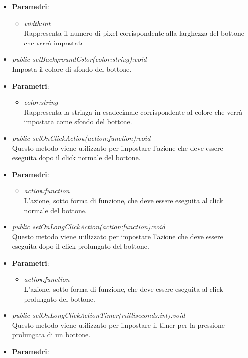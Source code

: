 \begin{itemize}
\begin{itemize}
		\item{\textbf{Parametri}: \begin{itemize}
		\item \textit{width:int}\\
		Rappresenta il numero di pixel corrispondente alla larghezza del bottone che verrà impostata.
		\end{itemize}}
	\item \textit{public setBackgroundColor(color:string):void}\\
	Imposta il colore di sfondo del bottone.
		\item{\textbf{Parametri}: \begin{itemize}
		\item \textit{color:string}\\
		Rappresenta la stringa in esadecimale corrispondente al colore che verrà impostata come sfondo del bottone.
		\end{itemize}}
	\item \textit{public setOnClickAction(action:function):void}\\
	Questo metodo viene utilizzato per impostare l'azione che deve essere eseguita dopo il click normale del bottone.
		\item{\textbf{Parametri}: \begin{itemize}
		\item \textit{action:function}\\
		L'azione, sotto forma di funzione, che deve essere eseguita al click normale del bottone.
		\end{itemize}}
	\item \textit{public setOnLongClickAction(action:function):void}\\
		Questo metodo viene utilizzato per impostare l'azione che deve essere eseguita dopo il click prolungato del bottone.
		\item{\textbf{Parametri}: \begin{itemize}
		\item \textit{action:function}\\
		L'azione, sotto forma di funzione, che deve essere eseguita al click prolungato del bottone.
		\end{itemize}}
		\item \textit{public setOnLongClickActionTimer(milliseconds:int):void}\\
		Questo metodo viene utilizzato per impostare il timer per la pressione prolungata di un bottone.
				\item{\textbf{Parametri}: \begin{itemize}

\end{itemize}}
\end{itemize}
\end{itemize}
